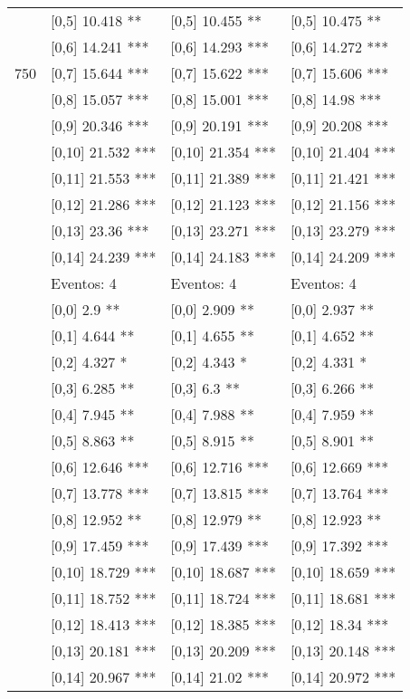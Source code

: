 \begin{table}
\begin{tabular}[t]{llll}
 & {}[0,5] 10.418 ** & {}[0,5] 10.455 ** & {}[0,5] 10.475 **\\
 & {}[0,6] 14.241 *** & {}[0,6] 14.293 *** & {}[0,6] 14.272 ***\\
750 & {}[0,7] 15.644 *** & {}[0,7] 15.622 *** & {}[0,7] 15.606 ***\\
\addlinespace
 & {}[0,8] 15.057 *** & {}[0,8] 15.001 *** & {}[0,8] 14.98 ***\\
 & {}[0,9] 20.346 *** & {}[0,9] 20.191 *** & {}[0,9] 20.208 ***\\
 & {}[0,10] 21.532 *** & {}[0,10] 21.354 *** & {}[0,10] 21.404 ***\\
 & {}[0,11] 21.553 *** & {}[0,11] 21.389 *** & {}[0,11] 21.421 ***\\
 & {}[0,12] 21.286 *** & {}[0,12] 21.123 *** & {}[0,12] 21.156 ***\\
\addlinespace
 & {}[0,13] 23.36 *** & {}[0,13] 23.271 *** & {}[0,13] 23.279 ***\\
 & {}[0,14] 24.239 *** & {}[0,14] 24.183 *** & {}[0,14] 24.209 ***\\
 & Eventos:  4 & Eventos:  4 & Eventos:  4\\
 & {}[0,0] 2.9 ** & {}[0,0] 2.909 ** & {}[0,0] 2.937 **\\
 & {}[0,1] 4.644 ** & {}[0,1] 4.655 ** & {}[0,1] 4.652 **\\
\addlinespace
 & {}[0,2] 4.327 * & {}[0,2] 4.343 * & {}[0,2] 4.331 *\\
 & {}[0,3] 6.285 ** & {}[0,3] 6.3 ** & {}[0,3] 6.266 **\\
 & {}[0,4] 7.945 ** & {}[0,4] 7.988 ** & {}[0,4] 7.959 **\\
 & {}[0,5] 8.863 ** & {}[0,5] 8.915 ** & {}[0,5] 8.901 **\\
 & {}[0,6] 12.646 *** & {}[0,6] 12.716 *** & {}[0,6] 12.669 ***\\
\addlinespace
1000 & {}[0,7] 13.778 *** & {}[0,7] 13.815 *** & {}[0,7] 13.764 ***\\
 & {}[0,8] 12.952 ** & {}[0,8] 12.979 ** & {}[0,8] 12.923 **\\
 & {}[0,9] 17.459 *** & {}[0,9] 17.439 *** & {}[0,9] 17.392 ***\\
 & {}[0,10] 18.729 *** & {}[0,10] 18.687 *** & {}[0,10] 18.659 ***\\
 & {}[0,11] 18.752 *** & {}[0,11] 18.724 *** & {}[0,11] 18.681 ***\\
\addlinespace
 & {}[0,12] 18.413 *** & {}[0,12] 18.385 *** & {}[0,12] 18.34 ***\\
 & {}[0,13] 20.181 *** & {}[0,13] 20.209 *** & {}[0,13] 20.148 ***\\
 & {}[0,14] 20.967 *** & {}[0,14] 21.02 *** & {}[0,14] 20.972 ***\\
\bottomrule
\end{tabular}
\end{table}

